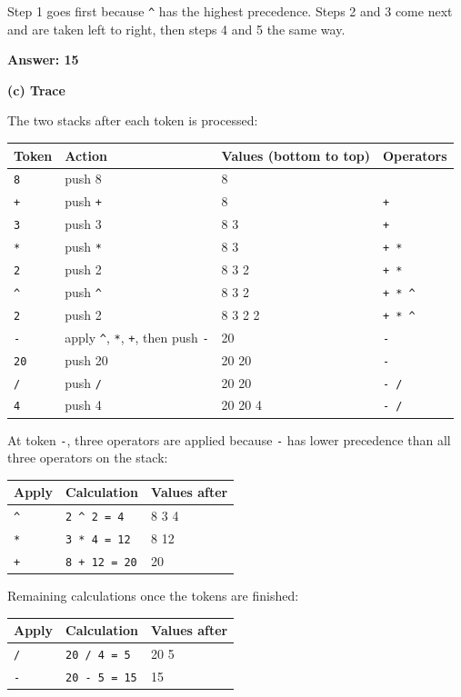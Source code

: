 \documentclass[11pt]{article}
\begin{document}
Step 1 goes first because \texttt{\^{}} has the highest precedence. Steps 2 and 3 come next
and are taken left to right, then steps 4 and 5 the same way.

\textbf{Answer: 15}

\textbf{(c) Trace}

The two stacks after each token is processed:

\begin{tabular}{llll}
Token & Action & Values (bottom to top) & Operators \\[2pt]
\hline
\texttt{8}  & push 8 & 8 & \\
\texttt{+}  & push \texttt{+} & 8 & \texttt{+} \\
\texttt{3}  & push 3 & 8 3 & \texttt{+} \\
\texttt{*}  & push \texttt{*} & 8 3 & \texttt{+ *} \\
\texttt{2}  & push 2 & 8 3 2 & \texttt{+ *} \\
\texttt{\^{}}  & push \texttt{\^{}} & 8 3 2 & \texttt{+ * \^{}} \\
\texttt{2}  & push 2 & 8 3 2 2 & \texttt{+ * \^{}} \\
\texttt{-}  & apply \texttt{\^{}}, \texttt{*}, \texttt{+}, then push \texttt{-} & 20 & \texttt{-} \\
\texttt{20} & push 20 & 20 20 & \texttt{-} \\
\texttt{/}  & push \texttt{/} & 20 20 & \texttt{- /} \\
\texttt{4}  & push 4 & 20 20 4 & \texttt{- /} \\
\end{tabular}

At token \texttt{-}, three operators are applied because \texttt{-} has lower precedence than
all three operators on the stack:

\begin{tabular}{lll}
Apply & Calculation & Values after \\[2pt]
\hline
\texttt{\^{}} & \texttt{2 \^{} 2 = 4} & 8 3 4 \\
\texttt{*}    & \texttt{3 * 4 = 12} & 8 12 \\
\texttt{+}    & \texttt{8 + 12 = 20} & 20 \\
\end{tabular}

Remaining calculations once the tokens are finished:

\begin{tabular}{lll}
Apply & Calculation & Values after \\[2pt]
\hline
\texttt{/} & \texttt{20 / 4 = 5} & 20 5 \\
\texttt{-} & \texttt{20 - 5 = 15} & 15 \\
\end{tabular}
\end{document}
